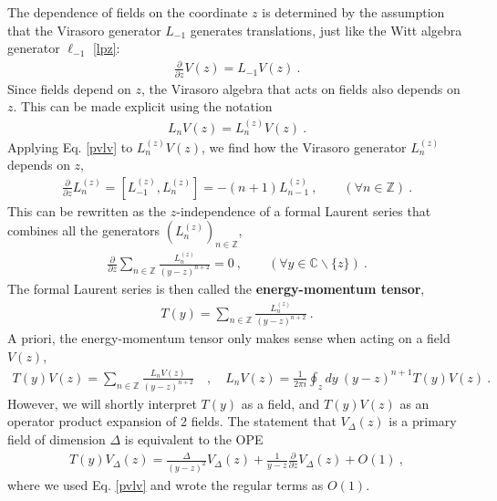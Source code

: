 \documentclass[12pt, a4paper]{article}
\newcommand{\myindex}[1]{\textbf{\boldmath #1}}
\begin{document}
The dependence of fields on the coordinate $z$ is determined by the assumption that the Virasoro generator $L_{-1}$ generates translations, just like the Witt algebra generator $\ell_{-1}$ \eqref{lpz}:
\begin{align}
  \boxed{\frac{\partial}{\partial z} V(z) = L_{-1} V(z)}  \ .
  \label{pvlv}
 \end{align}
 Since fields depend on $z$, the Virasoro algebra that acts on fields also depends on $z$. This can be made explicit using the notation
\begin{align}
   L_n V(z) = L_n^{(z)} V(z) \ . 
\end{align}
Applying Eq. \eqref{pvlv} to $L_n^{(z)} V(z)$, we find how the Virasoro generator $L_n^{(z)}$ depends on $z$,
 \begin{align}
 \frac{\partial}{\partial z} L_n^{(z)} = [L_{-1}^{(z)},L_n^{(z)}]= -(n+1)L_{n-1}^{(z)}\ ,\qquad (\forall n\in\mathbb{Z})\ .
\end{align}
This can be rewritten as the $z$-independence of a formal Laurent series that combines all the generators $(L_n^{(z)})_{n\in\mathbb{Z}}$, 
\begin{align}
 \frac{\partial}{\partial z} \sum_{n\in\mathbb{Z}} \frac{L_n^{(z)}}{(y-z)^{n+2}} = 0\ ,\qquad (\forall y\in\mathbb{C}\backslash \{z\})\ .
\end{align}
The formal Laurent series is then called the \myindex{energy-momentum tensor}, 
\begin{align}
  \boxed{T(y) = \sum_{n\in\mathbb{Z}} \frac{L_n^{(z)}}{(y-z)^{n+2}}} \ .
  \label{tl}
 \end{align}
 A priori, the energy-momentum tensor only makes sense when acting on a field $V(z)$,
 \begin{align}
 T(y)V(z) = \sum_{n\in\mathbb{Z}} \frac{L_n V(z)}{(y-z)^{n+2}}\quad , \quad L_n V(z) = \frac{1}{2\pi i} \oint_{z}dy\ (y-z)^{n+1} T(y)V(z)\ .
 \label{lvtv}
\end{align}
However, we will shortly interpret $T(y)$ as a field, and $T(y)V(z)$ as an operator product expansion of 2 fields. The statement that $V_\Delta(z)$ is a primary field of dimension $\Delta$ is equivalent to the OPE 
\begin{align}
 \boxed{T(y)V_\Delta(z) = \frac{\Delta}{(y-z)^2} V_\Delta(z) + \frac{1}{y-z} \frac{\partial}{\partial z} V_\Delta(z) + O(1)}\ ,
 \label{tvd}
\end{align}
where we used Eq. \eqref{pvlv} and wrote the regular terms as $O(1)$.
\end{document}
